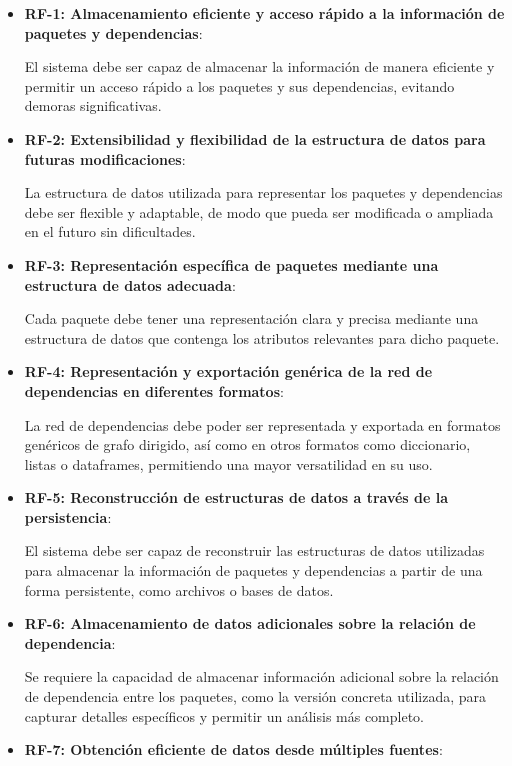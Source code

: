 \begin{itemize}
	\item \textbf{RF-1: Almacenamiento eficiente y acceso rápido a la información de paquetes y dependencias}:

	      El sistema debe ser capaz de almacenar la información de manera eficiente y permitir un acceso rápido a los paquetes y sus dependencias, evitando demoras significativas.

	\item \textbf{RF-2: Extensibilidad y flexibilidad de la estructura de datos para futuras modificaciones}:

	      La estructura de datos utilizada para representar los paquetes y dependencias debe ser flexible y adaptable, de modo que pueda ser modificada o ampliada en el futuro sin dificultades.

	\item \textbf{RF-3: Representación específica de paquetes mediante una estructura de datos adecuada}:

	      Cada paquete debe tener una representación clara y precisa mediante una estructura de datos que contenga los atributos relevantes para dicho paquete.

	\item \textbf{RF-4: Representación y exportación genérica de la red de dependencias en diferentes formatos}:

	      La red de dependencias debe poder ser representada y exportada en formatos genéricos de grafo dirigido, así como en otros formatos como diccionario, listas o dataframes, permitiendo una mayor versatilidad en su uso.

	\item \textbf{RF-5: Reconstrucción de estructuras de datos a través de la persistencia}:

	      El sistema debe ser capaz de reconstruir las estructuras de datos utilizadas para almacenar la información de paquetes y dependencias a partir de una forma persistente, como archivos o bases de datos.

	\item \textbf{RF-6: Almacenamiento de datos adicionales sobre la relación de dependencia}:

	      Se requiere la capacidad de almacenar información adicional sobre la relación de dependencia entre los paquetes, como la versión concreta utilizada, para capturar detalles específicos y permitir un análisis más completo.

	\item \textbf{RF-7: Obtención eficiente de datos desde múltiples fuentes}:


\end{itemize}
